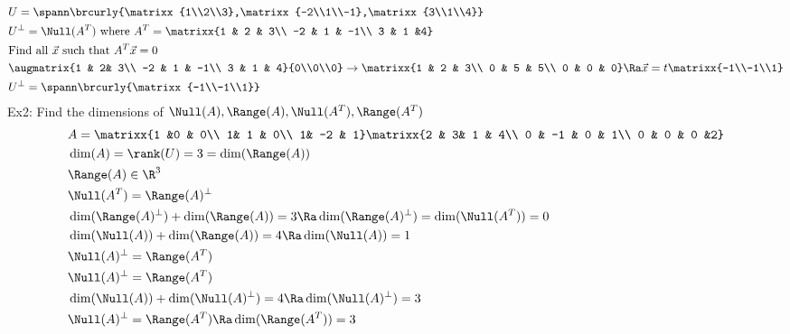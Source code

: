 \begin{align*}
    &U=\spann\brcurly{\matrixx{1\\2\\3},\matrixx{-2\\1\\-1},\matrixx{3\\1\\4}}\\
    &U^\perp=\Null(A^T)\text{ where }A^T=\matrixx{1 & 2 & 3\\ -2 & 1 & -1\\ 3 & 1 &4}\\
    &\text{Find all $\vec{x}$ such that $A^T\vec{x}=0$}\\
    &\augmatrix{1 & 2& 3\\ -2 & 1 & -1\\ 3 & 1 & 4}{0\\0\\0}\to\matrixx{1 & 2 & 3\\ 0 & 5 & 5\\ 0 & 0 & 0}\Ra \vec{x}=t\matrixx{-1\\-1\\1}\\
    &U^\perp=\spann\brcurly{\matrixx{-1\\-1\\1}}
\end{align*}
Ex2: Find the dimensions of $\Null(A),\Range(A),\Null(A^T),\Range(A^T)$
\begin{align*}
    &A=\matrixx{1 &0 & 0\\ 1& 1 & 0\\ 1& -2 & 1}\matrixx{2 & 3& 1 & 4\\ 0 & -1 & 0 & 1\\ 0 & 0 & 0 &2}\\
    &\dim(A)=\rank(U)=3=\dim(\Range(A))\\
    &\Range(A)\in\R^3\\
    &\Null(A^T)=\Range(A)^\perp\\
    &\dim(\Range(A)^\perp)+\dim(\Range(A))=3\Ra \dim(\Range(A)^\perp)=\dim(\Null(A^T))=0\\
    &\dim(\Null(A))+\dim(\Range(A))=4\Ra \dim(\Null(A))=1\\
    &\Null(A)^\perp=\Range(A^T)\\
    &\Null(A)^\perp=\Range(A^T)\\
    &\dim(\Null(A))+\dim(\Null(A)^\perp)=4\Ra \dim(\Null(A)^\perp)=3\\
    &\Null(A)^\perp=\Range(A^T)\Ra \dim(\Range(A^T))=3
\end{align*}
